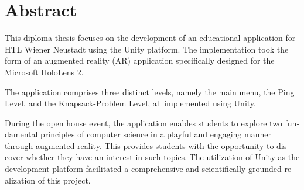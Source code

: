 \chapter{Abstract}

\begin{english} %
This diploma thesis focuses on the development of an educational application for HTL Wiener Neustadt using the Unity
platform. The implementation took the form of an augmented reality (AR) application specifically designed for the
Microsoft HoloLens 2.

The application comprises three distinct levels, namely the main menu, the Ping Level, and the Knapsack-Problem
Level, all implemented using Unity.

During the open house event, the application enables students to explore two fundamental principles of computer
science in a playful and engaging manner through augmented reality. This provides students with the opportunity
to discover whether they have an interest in such topics. The utilization of Unity as the development platform
facilitated a comprehensive and scientifically grounded realization of this project.
\end{english}


